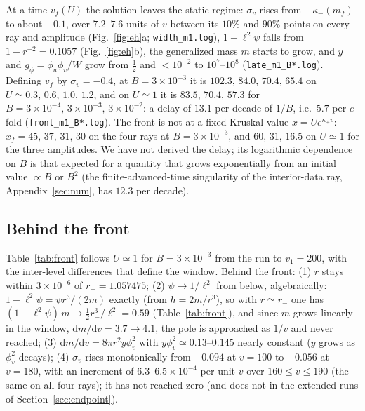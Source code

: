 \documentclass[11pt]{article}
\begin{document}
At a time $v_f(U)$ the solution leaves the static regime: $\sigma_v$ rises from $-\kappa_-(m_f)$ to about $-0.1$, over $7.2$--$7.6$ units of $v$ between its $10\%$ and $90\%$ points on every ray and amplitude (Fig.~\ref{fig:eh}a; \texttt{width\_m1.log}), $1-\ell^{2}\psi$ falls from $1-r_-^{-2}=0.1057$ (Fig.~\ref{fig:eh}b), the generalized mass $m$ starts to grow, and $y$ and $g_\phi=\phi_u\phi_v/W$ grow from $\tfrac12$ and $<10^{-2}$ to $10^{7}$--$10^{8}$ (\texttt{late\_m1\_B*.log}). Defining $v_f$ by $\sigma_v=-0.4$, at $B=3\times10^{-3}$ it is $102.3,\,84.0,\,70.4,\,65.4$ on $U\simeq0.3,\,0.6,\,1.0,\,1.2$, and on $U\simeq1$ it is $83.5,\,70.4,\,57.3$ for $B=3\times10^{-4},\,3\times10^{-3},\,3\times10^{-2}$: a delay of $13.1$ per decade of $1/B$, i.e.\ $5.7$ per $e$-fold (\texttt{front\_m1\_B*.log}). The front is not at a fixed Kruskal value $x=Ue^{\kappa_+v}$: $x_f=45,\,37,\,31,\,30$ on the four rays at $B=3\times10^{-3}$, and $60,\,31,\,16.5$ on $U\simeq1$ for the three amplitudes. We have not derived the delay; its logarithmic dependence on $B$ is that expected for a quantity that grows exponentially from an initial value $\propto B$ or $B^{2}$ (the finite-advanced-time singularity of the interior-data ray, Appendix~\ref{sec:num}, has $12.3$ per decade).

\subsection{Behind the front}

Table~\ref{tab:front} follows $U\simeq1$ for $B=3\times10^{-3}$ from the run to $v_1=200$, with the inter-level differences that define the window. Behind the front: (1) $r$ stays within $3\times10^{-6}$ of $r_-=1.057475$; (2) $\psi\to1/\ell^{2}$ from below, algebraically: $1-\ell^{2}\psi=\psi r^{3}/(2m)$ exactly (from $h=2m/r^{3}$), so with $r\simeq r_-$ one has $(1-\ell^{2}\psi)\,m\to\tfrac12r_-^{3}/\ell^{2}=0.59$ (Table~\ref{tab:front}), and since $m$ grows linearly in the window, $\mathrm{d}m/\mathrm{d}v=3.7\to4.1$, the pole is approached as $1/v$ and never reached; (3) $\mathrm{d}m/\mathrm{d}v=8\pi r^{2}y\phi_v^{2}$ with $y\phi_v^{2}\simeq0.13$--$0.145$ nearly constant ($y$ grows as $\phi_v^{2}$ decays); (4) $\sigma_v$ rises monotonically from $-0.094$ at $v=100$ to $-0.056$ at $v=180$, with an increment of $6.3$--$6.5\times10^{-4}$ per unit $v$ over $160\le v\le190$ (the same on all four rays); it has not reached zero (and does not in the extended runs of Section~\ref{sec:endpoint}).
\end{document}
